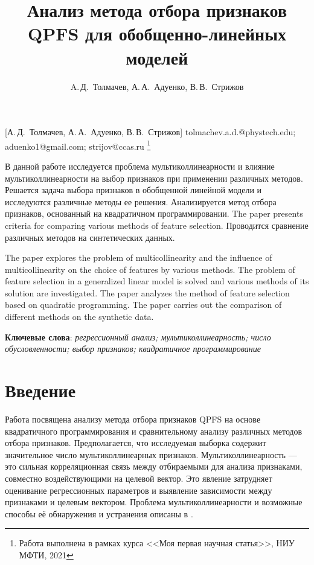 \documentclass[12pt, twoside]{article}
\begin{document}
\title
    [Анализ метода отбора признаков QPFS для обобщенно-линейных моделей] %
    {Анализ метода отбора признаков QPFS для обобщенно-линейных моделей}
\author
    [A.\,Д.~Толмачев] %
    {A.\,Д.~Толмачев, А.\,А.~Адуенко, В.\,В.~Стрижов} %
    [А.\,Д.~Толмачев, А.\,А.~Адуенко, В.\,В.~Стрижов] %
\email
    {tolmachev.a.d.@phystech.edu; aduenko1@gmail.com; strijov@ccas.ru}
\thanks
    {Работа выполнена в рамках курса <<Моя первая научная статья>>, НИУ МФТИ, 2021}
    
\abstract
    {В данной работе исследуется проблема мультиколлинеарности и влияние мультиколлинеарности
    на выбор признаков при применении различных методов. Решается задача выбора признаков в обобщенной линейной модели и исследуются различные методы ее решения. Анализируется метод отбора признаков, основанный на квадратичном программировании. The paper presents criteria for comparing various methods of feature selection. Проводится сравнение различных методов на синтетических данных.
    
\bigskip
    The paper explores the problem of multicollinearity and the influence of multicollinearity on the choice of features by various methods. The problem of feature selection in a generalized linear model is solved and various methods of its solution are investigated. The paper analyzes the method of feature selection based on quadratic programming. The paper carries out the comparison of different methods on the synthetic data.

\bigskip
\noindent
\textbf{Ключевые слова}: \emph {регрессионный анализ; мультиколлинеарность; число обусловленности; выбор признаков;  квадратичное программирование}
}





\maketitle
\linenumbers

\section{Введение}
Работа посвящена анализу метода отбора признаков QPFS на основе квадратичного программирования и сравнительному анализу различных методов отбора признаков. Предполагается, что исследуемая выборка содержит значительное число мультиколлинеарных признаков. Мультиколлинеарность — это сильная корреляционная связь между отбираемыми для анализа признаками, совместно
воздействующими на целевой вектор. Это явление затрудняет оценивание регрессионных параметров и выявление зависимости между признаками и целевым вектором. Проблема мультиколлинеарности и возможные способы её обнаружения и устранения описаны в \cite{SneeRon, Leamer, Askin}. 
\end{document}
